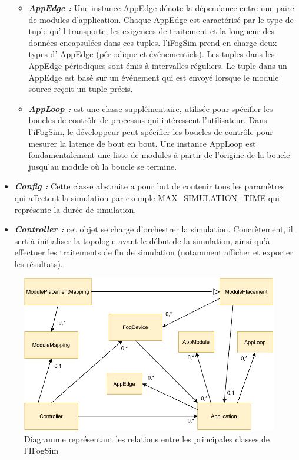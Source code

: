 \begin{itemize}
    \begin{itemize}
        \item \textbf{\emph{AppEdge :}} Une instance AppEdge dénote la dépendance entre une paire de modules d'application. Chaque AppEdge est caractérisé par le type de tuple qu'il transporte, les exigences de traitement et la longueur des données encapsulées dans ces tuples. l’iFogSim prend en charge deux types d’ AppEdge (périodique et événementiels). Les tuples dans les AppEdge périodiques sont émis à intervalles réguliers. Le tuple dans un AppEdge est basé sur un événement qui est envoyé lorsque le module source reçoit un tuple précis.
        \item \textbf{\emph{AppLoop :}} est une classe supplémentaire, utilisée pour spécifier les boucles de contrôle de processus qui intéressent l'utilisateur. Dans l’iFogSim, le développeur peut spécifier les boucles de contrôle pour mesurer la latence de bout en bout. Une instance AppLoop est fondamentalement une liste de modules à partir de l'origine de la boucle jusqu'au module où la boucle se termine.
    \end{itemize}
    \item \textbf{\emph{Config :}} Cette classe abstraite a pour but de contenir tous les paramètres qui affectent la simulation par exemple MAX\_SIMULATION\_TIME qui représente la durée de simulation.
    \item \textbf{\emph{Controller :}} cet objet se charge d’orchestrer la simulation. Concrètement, il sert à initialiser la topologie avant le début de la simulation, ainsi qu’à effectuer les traitements de fin de simulation (notamment afficher et exporter les résultats).
\end{itemize}
\begin{figure}[H]
    \centering
    \includegraphics[]{src/ressources/Diagramme de relation.pdf}
    \caption{Diagramme représentant les relations entre les principales classes de l'IFogSim}
    \label{fig:}
\end{figure}

